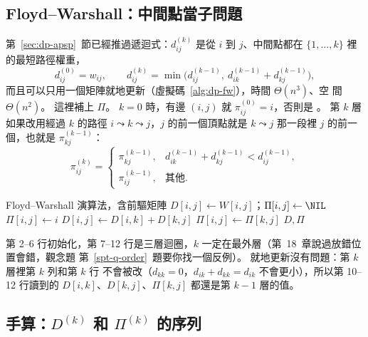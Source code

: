 \subsection{Floyd--Warshall：中間點當子問題}

第~\ref{sec:dp-apsp}~節已經推過遞迴式：$d_{ij}^{(k)}$ 是從 $i$ 到 $j$、中間點都在 $\{1, \ldots, k\}$
裡的最短路徑權重，
\[
d_{ij}^{(0)} = w_{ij}, \qquad
d_{ij}^{(k)} = \min\bigl( d_{ij}^{(k-1)},\ d_{ik}^{(k-1)} + d_{kj}^{(k-1)} \bigr),
\]
而且可以只用一個矩陣就地更新（虛擬碼~\ref{alg:dp-fw}），時間 $\Theta(n^3)$、空
間 $\Theta(n^2)$。 這裡補上 $\Pi$。 $k = 0$ 時，有邊 $(i, j)$ 就 $\pi_{ij}^{(0)} = i$，否則是
\NIL。 第 $k$ 層如果改用經過 $k$ 的路徑 $i \leadsto k \leadsto j$，$j$ 的前一個頂點就是
$k \leadsto j$ 那一段裡 $j$ 的前一個，也就是 $\pi_{kj}^{(k-1)}$：
\[
\pi_{ij}^{(k)} = \begin{cases}
\pi_{kj}^{(k-1)}, & d_{ik}^{(k-1)} + d_{kj}^{(k-1)} < d_{ij}^{(k-1)}, \\
\pi_{ij}^{(k-1)}, & \text{其他}.
\end{cases}
\]

\begin{pseudo}[label=alg:spt-fw]{Floyd--Warshall 演算法，含前驅矩陣}
            \State $D[i, j] \gets W[i, j]$；$\Pi[i, j] \gets \NIL$
                \State $\Pi[i, j] \gets i$
            \EndIf
        \EndFor
    \EndFor
                    \State $D[i, j] \gets D[i, k] + D[k, j]$
                    \State $\Pi[i, j] \gets \Pi[k, j]$
                \EndIf
            \EndFor
        \EndFor
    \EndFor
    \State \Return $D, \Pi$
\EndFunction
\end{pseudo}

第 2--6 行初始化，第 7--12 行是三層迴圈，$k$ 一定在最外層（第~18~章說過放錯位置會錯，觀念題
第~\ref{spt-q-order}~題要你找一個反例）。 就地更新沒有問題：第 $k$ 層裡第 $k$ 列和第 $k$ 行
不會被改（$d_{kk} = 0$，$d_{ik} + d_{kk} = d_{ik}$ 不會更小），所以第 10--12 行讀到的
$D[i, k]$、$D[k, j]$、$\Pi[k, j]$ 都還是第 $k - 1$ 層的值。

\subsection{手算：$D^{(k)}$ 和 $\Pi^{(k)}$ 的序列}
\label{sec:spt-fw-trace}

